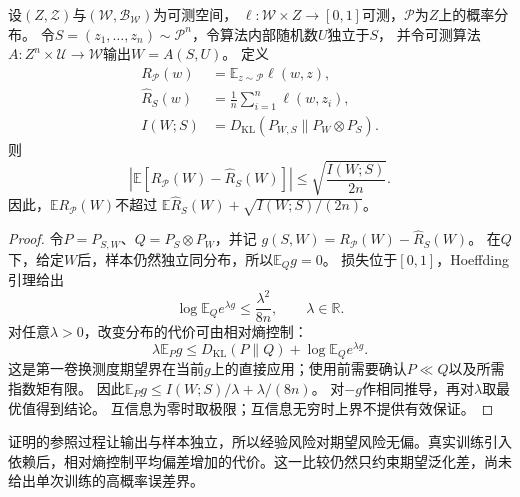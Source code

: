 \begin{theorem}[互信息与期望风险]
\label{thm:mutual-information-risk}
设$(Z,\mathcal Z)$与$(\mathcal W,\mathcal B_{\mathcal W})$为可测空间，
$\ell:\mathcal W\times Z\to[0,1]$可测，$\mathcal P$为$Z$上的概率分布。
令$S=(z_1,\ldots,z_n)\sim\mathcal P^n$，令算法内部随机数$U$独立于$S$，
并令可测算法$A:Z^n\times\mathcal U\to\mathcal W$输出$W=A(S,U)$。
定义
\[
\begin{aligned}
 R_{\mathcal P}(w)
 &=\mathbb E_{z\sim\mathcal P}\ell(w,z),\\
 \hat R_S(w)
 &=\frac1n\sum_{i=1}^n\ell(w,z_i),\\
 I(W;S)
 &=D_{\mathrm{KL}}(P_{W,S}\|P_W\otimes P_S).
\end{aligned}
\]
则
\begin{equation}
 \left|\mathbb E[R_{\mathcal P}(W)-\hat R_S(W)]\right|
 \leq\sqrt{\frac{I(W;S)}{2n}}.
 \label{eq:mutual-information-generalization}
\end{equation}
因此，$\mathbb E R_{\mathcal P}(W)$不超过
$\mathbb E\hat R_S(W)+\sqrt{I(W;S)/(2n)}$。
\end{theorem}
\begin{proof}
令$P=P_{S,W}$、$Q=P_S\otimes P_W$，并记
$g(S,W)=R_{\mathcal P}(W)-\hat R_S(W)$。
在$Q$下，给定$W$后，样本仍然独立同分布，所以$\mathbb E_Qg=0$。
损失位于$[0,1]$，Hoeffding引理给出
\[
 \log\mathbb E_Q e^{\lambda g}\leq\frac{\lambda^2}{8n},
 \qquad \lambda\in\mathbb R.
\]
对任意$\lambda>0$，改变分布的代价可由相对熵控制：
\begin{equation}
 \lambda\mathbb E_Pg
 \leq D_{\mathrm{KL}}(P\|Q)+\log\mathbb E_Q e^{\lambda g}.
 \label{eq:information-change-measure}
\end{equation}
这是第一卷换测度期望界在当前$g$上的直接应用；使用前需要确认$P\ll Q$以及所需
指数矩有限。
因此$\mathbb E_Pg\leq I(W;S)/\lambda+\lambda/(8n)$。
对$-g$作相同推导，再对$\lambda$取最优值得到结论。
互信息为零时取极限；互信息无穷时上界不提供有效保证。
\end{proof}

证明的参照过程让输出与样本独立，所以经验风险对期望风险无偏。真实训练引入依赖后，相对熵控制平均偏差增加的代价。这一比较仍然只约束期望泛化差，尚未给出单次训练的高概率误差界。

